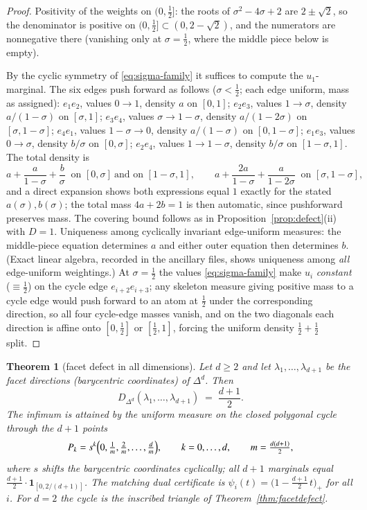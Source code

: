 \documentclass{aims}
\numberwithin{equation}{section}
\theoremstyle{plain}
\newtheorem{theorem}{Theorem}[section]
\theoremstyle{definition}
\theoremstyle{remark}
\begin{document}
\begin{proof}
Positivity of the weights on $(0,\tfrac12]$: the roots of $\sigma^2-4\sigma+2$
are $2\pm\sqrt2$, so the denominator is positive on
$(0,\tfrac12]\subset(0,2-\sqrt2)$, and the numerators are nonnegative there
(vanishing only at $\sigma=\tfrac12$, where the middle piece below is empty).

By the cyclic symmetry of \eqref{eq:sigma-family} it suffices to compute the
$u_1$-marginal. The six edges push forward as follows ($\sigma<\tfrac12$; each
edge uniform, mass as assigned): $e_1e_2$, values $0\to1$, density $a$ on
$[0,1]$; $e_2e_3$, values $1\to\sigma$, density $a/(1-\sigma)$ on $[\sigma,1]$;
$e_3e_4$, values $\sigma\to1-\sigma$, density $a/(1-2\sigma)$ on
$[\sigma,1-\sigma]$; $e_4e_1$, values $1-\sigma\to0$, density $a/(1-\sigma)$ on
$[0,1-\sigma]$; $e_1e_3$, values $0\to\sigma$, density $b/\sigma$ on
$[0,\sigma]$; $e_2e_4$, values $1\to1-\sigma$, density $b/\sigma$ on
$[1-\sigma,1]$. The total density is
\[
a+\frac{a}{1-\sigma}+\frac b\sigma\ \text{ on }[0,\sigma]\ \text{and on }
[1-\sigma,1],\qquad
a+\frac{2a}{1-\sigma}+\frac{a}{1-2\sigma}\ \text{ on }[\sigma,1-\sigma],
\]
and a direct expansion shows both expressions equal $1$ exactly for the stated
$a(\sigma),b(\sigma)$; the total mass $4a+2b=1$ is then automatic, since
pushforward preserves mass. The covering bound follows as in
Proposition~\ref{prop:defect}(ii) with $D=1$. Uniqueness among cyclically
invariant edge-uniform measures: the middle-piece equation determines $a$ and
either outer equation then determines $b$. (Exact linear algebra, recorded in
the ancillary files, shows uniqueness among \emph{all} edge-uniform weightings.)
At $\sigma=\tfrac12$ the values \eqref{eq:sigma-family}
make $u_i$ \emph{constant} ($\equiv\tfrac12$) on the cycle edge
$e_{i+2}e_{i+3}$; any skeleton measure giving positive mass to a cycle edge
would push forward to an atom at $\tfrac12$ under the corresponding direction,
so all four cycle-edge masses vanish, and on the two diagonals each direction is
affine onto $[0,\tfrac12]$ or $[\tfrac12,1]$, forcing the uniform density
$\tfrac12+\tfrac12$ split.
\end{proof}

\begin{theorem}[facet defect in all dimensions]\label{thm:facetd}
Let $d\ge2$ and let $\lambda_1,\dots,\lambda_{d+1}$ be the facet directions
(barycentric coordinates) of $\Delta^d$. Then
\[
D_{\Delta^d}(\lambda_1,\dots,\lambda_{d+1})\;=\;\frac{d+1}2 .
\]
The infimum is attained by the uniform measure on the closed polygonal cycle
through the $d+1$ points
\[
P_k=s^k\Bigl(0,\tfrac1m,\tfrac2m,\dots,\tfrac dm\Bigr),\qquad k=0,\dots,d,
\qquad m=\tfrac{d(d+1)}2,
\]
where $s$ shifts the barycentric coordinates cyclically; all $d+1$ marginals
equal $\tfrac{d+1}2\cdot\mathbf1_{[0,2/(d+1)]}$. The matching dual certificate
is $\psi_i(t)=\bigl(1-\tfrac{d+1}2\,t\bigr)_+$ for all $i$. For $d=2$ the cycle
is the inscribed triangle of Theorem~\ref{thm:facetdefect}.
\end{theorem}
\end{document}
